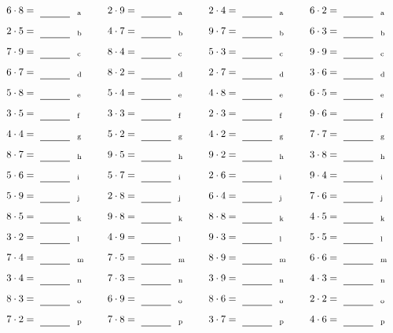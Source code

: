\documentclass
[
  draft    = true,
  fontsize = 11pt,
  parskip  = half-
]
{scrartcl}
\begin{document}
\par\vfill\par
\begin{align*}
    \pline{6\cdot8}&=\rline{a}
  & \pline{2\cdot9}&=\rline{a}
  & \pline{2\cdot4}&=\rline{a}
  & \pline{6\cdot2}&=\rline{a} \\[1ex]
    \pline{2\cdot5}&=\rline{b}
  & \pline{4\cdot7}&=\rline{b}
  & \pline{9\cdot7}&=\rline{b}
  & \pline{6\cdot3}&=\rline{b} \\[1ex]
    \pline{7\cdot9}&=\rline{c}
  & \pline{8\cdot4}&=\rline{c}
  & \pline{5\cdot3}&=\rline{c}
  & \pline{9\cdot9}&=\rline{c} \\[1ex]
    \pline{6\cdot7}&=\rline{d}
  & \pline{8\cdot2}&=\rline{d}
  & \pline{2\cdot7}&=\rline{d}
  & \pline{3\cdot6}&=\rline{d} \\[1ex]
    \pline{5\cdot8}&=\rline{e}
  & \pline{5\cdot4}&=\rline{e}
  & \pline{4\cdot8}&=\rline{e}
  & \pline{6\cdot5}&=\rline{e} \\[1ex]
    \pline{3\cdot5}&=\rline{f}
  & \pline{3\cdot3}&=\rline{f}
  & \pline{2\cdot3}&=\rline{f}
  & \pline{9\cdot6}&=\rline{f} \\[1ex]
    \pline{4\cdot4}&=\rline{g}
  & \pline{5\cdot2}&=\rline{g}
  & \pline{4\cdot2}&=\rline{g}
  & \pline{7\cdot7}&=\rline{g} \\[1ex]
    \pline{8\cdot7}&=\rline{h}
  & \pline{9\cdot5}&=\rline{h}
  & \pline{9\cdot2}&=\rline{h}
  & \pline{3\cdot8}&=\rline{h} \\[1ex]
    \pline{5\cdot6}&=\rline{i}
  & \pline{5\cdot7}&=\rline{i}
  & \pline{2\cdot6}&=\rline{i}
  & \pline{9\cdot4}&=\rline{i} \\[1ex]
    \pline{5\cdot9}&=\rline{j}
  & \pline{2\cdot8}&=\rline{j}
  & \pline{6\cdot4}&=\rline{j}
  & \pline{7\cdot6}&=\rline{j} \\[1ex]
    \pline{8\cdot5}&=\rline{k}
  & \pline{9\cdot8}&=\rline{k}
  & \pline{8\cdot8}&=\rline{k}
  & \pline{4\cdot5}&=\rline{k} \\[1ex]
    \pline{3\cdot2}&=\rline{l}
  & \pline{4\cdot9}&=\rline{l}
  & \pline{9\cdot3}&=\rline{l}
  & \pline{5\cdot5}&=\rline{l} \\[1ex]
    \pline{7\cdot4}&=\rline{m}
  & \pline{7\cdot5}&=\rline{m}
  & \pline{8\cdot9}&=\rline{m}
  & \pline{6\cdot6}&=\rline{m} \\[1ex]
    \pline{3\cdot4}&=\rline{n}
  & \pline{7\cdot3}&=\rline{n}
  & \pline{3\cdot9}&=\rline{n}
  & \pline{4\cdot3}&=\rline{n} \\[1ex]
    \pline{8\cdot3}&=\rline{o}
  & \pline{6\cdot9}&=\rline{o}
  & \pline{8\cdot6}&=\rline{o}
  & \pline{2\cdot2}&=\rline{o} \\[1ex]
    \pline{7\cdot2}&=\rline{p}
  & \pline{7\cdot8}&=\rline{p}
  & \pline{3\cdot7}&=\rline{p}
  & \pline{4\cdot6}&=\rline{p}
\end{align*}
\end{document}

